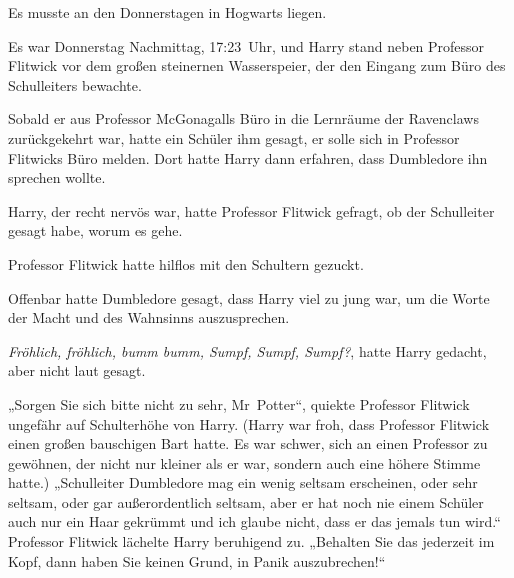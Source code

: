 Es musste an den Donnerstagen in Hogwarts liegen.

Es war Donnerstag Nachmittag, 17:23~Uhr, und Harry stand neben Professor Flitwick vor dem großen steinernen Wasserspeier, der den Eingang zum Büro des Schulleiters bewachte.

Sobald er aus Professor McGonagalls Büro in die Lernräume der Ravenclaws zurückgekehrt war, hatte ein Schüler ihm gesagt, er solle sich in Professor Flitwicks Büro melden. Dort hatte Harry dann erfahren, dass Dumbledore ihn sprechen wollte.

Harry, der recht nervös war, hatte Professor Flitwick gefragt, ob der Schulleiter gesagt habe, worum es gehe.

Professor Flitwick hatte hilflos mit den Schultern gezuckt.

Offenbar hatte Dumbledore gesagt, dass Harry viel zu jung war, um die Worte der Macht und des Wahnsinns auszusprechen.

\emph{Fröhlich, fröhlich, bumm bumm, Sumpf, Sumpf, Sumpf?}, hatte Harry gedacht, aber nicht laut gesagt.

„Sorgen Sie sich bitte nicht zu sehr, Mr~Potter“, quiekte Professor Flitwick ungefähr auf Schulterhöhe von Harry. (Harry war froh, dass Professor Flitwick einen großen bauschigen Bart hatte. Es war schwer, sich an einen Professor zu gewöhnen, der nicht nur kleiner als er war, sondern auch eine höhere Stimme hatte.) „Schulleiter Dumbledore mag ein wenig seltsam erscheinen, oder sehr seltsam, oder gar außerordentlich seltsam, aber er hat noch nie einem Schüler auch nur ein Haar gekrümmt und ich glaube nicht, dass er das jemals tun wird.“ Professor Flitwick lächelte Harry beruhigend zu. „Behalten Sie das jederzeit im Kopf, dann haben Sie keinen Grund, in Panik auszubrechen!“

